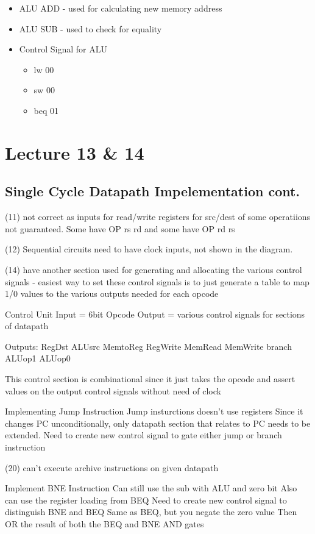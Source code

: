 \documentclass{article}
\begin{document}
		\begin{itemize}
			\item ALU ADD - used for calculating new memory address
			\item ALU SUB - used to check for equality
			\item Control Signal for ALU
			\begin{itemize}
				\item lw 00
				\item sw 00
				\item beq 01
			\end{itemize}
		\end{itemize}
		
\section{Lecture 13 \& 14}
	\subsection{Single Cycle Datapath Impelementation cont.}
		(11) not correct as inputs for read/write registers for src/dest of some operatiions not guaranteed. Some have OP rs rd and some have OP rd rs

		(12) Sequential circuits need to have clock inputs, not shown in the diagram.

		(14) have another section used for generating and allocating the various control signals
		- easiest way to set these control signals is to just generate a table to map 1/0 values to the various outputs needed for each opcode

		Control Unit
			Input = 6bit Opcode
			Output = various control signals for sections of datapath

			Outputs:
				RegDst
				ALUsrc
				MemtoReg
				RegWrite
				MemRead
				MemWrite
				branch
				ALUop1
				ALUop0

			This control section is combinational since it just takes the opcode and assert values on the output control signals without need of clock

		Implementing Jump Instruction
			Jump insturctions doesn't use registers
			Since it changes PC unconditionally, only datapath section that relates to PC needs to be extended. 
			Need to create new control signal to gate either jump or branch instruction

		(20) can't execute archive instructions on given datapath 

		Implement BNE Instruction
			Can still use the sub with ALU and zero bit
			Also can use the register loading from BEQ
			Need to create new control signal to distinguish BNE and BEQ
				Same as BEQ, but you negate the zero value
			Then OR the result  of both the BEQ and BNE AND gates
\end{document}
